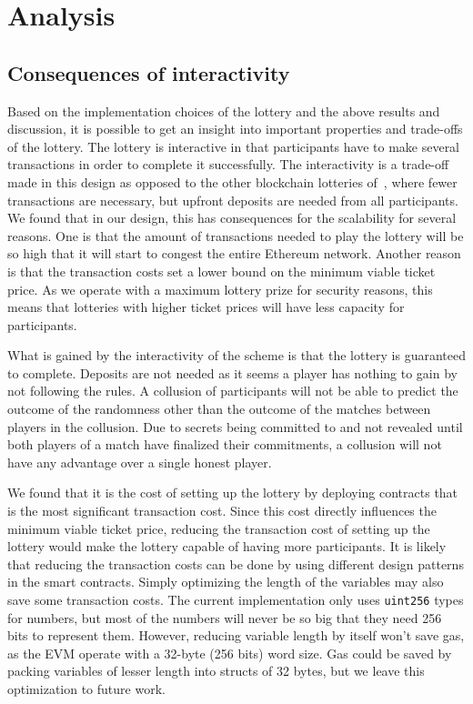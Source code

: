 \section{Analysis}
\label{sec:analysis}

\subsection{Consequences of interactivity}

Based on the implementation choices of the lottery and the above results and discussion, it is possible to get an insight into important properties and trade-offs of the lottery. The lottery is interactive in that participants have to make several transactions in order to complete it successfully. The interactivity is a trade-off made in this design as opposed to the other blockchain lotteries of~\cite{andrychowicz_secure_2014,bentov_how_2014}, where fewer transactions are necessary, but upfront deposits are needed from all participants. We found that in our design, this has consequences for the scalability for several reasons. One is that the amount of transactions needed to play the lottery will be so high that it will start to congest the entire Ethereum network. Another reason is that the transaction costs set a lower bound on the minimum viable ticket price. As we operate with a maximum lottery prize for security reasons, this means that lotteries with higher ticket prices will have less capacity for participants.

What is gained by the interactivity of the scheme is that the lottery is guaranteed to complete. Deposits are not needed as it seems a player has nothing to gain by not following the rules. A collusion of participants will not be able to predict the outcome of the randomness other than the outcome of the matches between players in the collusion. Due to secrets being committed to and not revealed until both players of a match have finalized their commitments, a collusion will not have any advantage over a single honest player.

We found that it is the cost of setting up the lottery by deploying contracts that is the most significant transaction cost. Since this cost directly influences the minimum viable ticket price, reducing the transaction cost of setting up the lottery would make the lottery capable of having more participants. It is likely that reducing the transaction costs can be done by using different design patterns in the smart contracts. Simply optimizing the length of the variables may also save some transaction costs. The current implementation only uses \texttt{uint256} types for numbers, but most of the numbers will never be so big that they need 256 bits to represent them. However, reducing variable length by itself won't save gas, as the EVM operate with a 32-byte (256 bits) word size. Gas could be saved by packing variables of lesser length into structs of 32 bytes, but we leave this optimization to future work.

